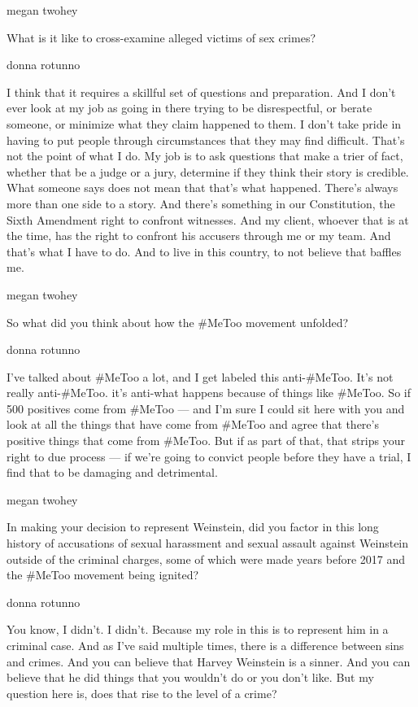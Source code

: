megan twohey

What is it like to cross-examine alleged victims of sex crimes?

donna rotunno

I think that it requires a skillful set of questions and preparation.
And I don't ever look at my job as going in there trying to be
disrespectful, or berate someone, or minimize what they claim happened
to them. I don't take pride in having to put people through
circumstances that they may find difficult. That's not the point of what
I do. My job is to ask questions that make a trier of fact, whether that
be a judge or a jury, determine if they think their story is credible.
What someone says does not mean that that's what happened. There's
always more than one side to a story. And there's something in our
Constitution, the Sixth Amendment right to confront witnesses. And my
client, whoever that is at the time, has the right to confront his
accusers through me or my team. And that's what I have to do. And to
live in this country, to not believe that baffles me.

megan twohey

So what did you think about how the \#MeToo movement unfolded?

donna rotunno

I've talked about \#MeToo a lot, and I get labeled this anti-\#MeToo.
It's not really anti-\#MeToo. it's anti-what happens because of things
like \#MeToo. So if 500 positives come from \#MeToo --- and I'm sure I
could sit here with you and look at all the things that have come from
\#MeToo and agree that there's positive things that come from \#MeToo.
But if as part of that, that strips your right to due process --- if
we're going to convict people before they have a trial, I find that to
be damaging and detrimental.

megan twohey

In making your decision to represent Weinstein, did you factor in this
long history of accusations of sexual harassment and sexual assault
against Weinstein outside of the criminal charges, some of which were
made years before 2017 and the \#MeToo movement being ignited?

donna rotunno

You know, I didn't. I didn't. Because my role in this is to represent
him in a criminal case. And as I've said multiple times, there is a
difference between sins and crimes. And you can believe that Harvey
Weinstein is a sinner. And you can believe that he did things that you
wouldn't do or you don't like. But my question here is, does that rise
to the level of a crime?

